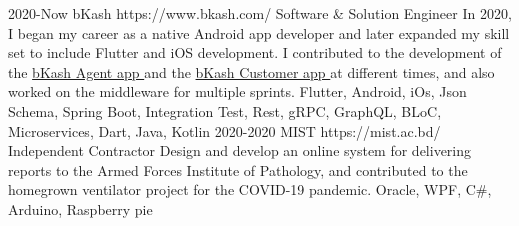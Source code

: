 
\horizontalLineRight

\listItemOne
    {2020-Now}
    {bKash}
    {https://www.bkash.com/}
    {Software \& Solution Engineer}
    {In 2020, I began my career as a native Android app developer and later expanded my skill set to include Flutter and iOS development.
    I contributed to the development of the \href{https://play.google.com/store/apps/details?id=com.bkash.businessapp}{bKash Agent app  \linkIcon} and
    the \href{https://play.google.com/store/apps/details?id=com.bKash.customerapp}{bKash Customer app \linkIcon} at different times,
    and also worked on the middleware for multiple sprints.}
    {Flutter, Android, iOs, Json Schema, Spring Boot, Integration Test, Rest, gRPC, GraphQL, BLoC, Microservices, Dart, Java, Kotlin}
\listItemOne
    {2020-2020}
    {MIST}
    {https://mist.ac.bd/}
    {Independent Contractor}
    {Design and develop an online system for delivering reports to the Armed Forces Institute of Pathology,
        and contributed to the homegrown ventilator project for the COVID-19 pandemic.}
    {Oracle, WPF, C\#, Arduino, Raspberry pie}%